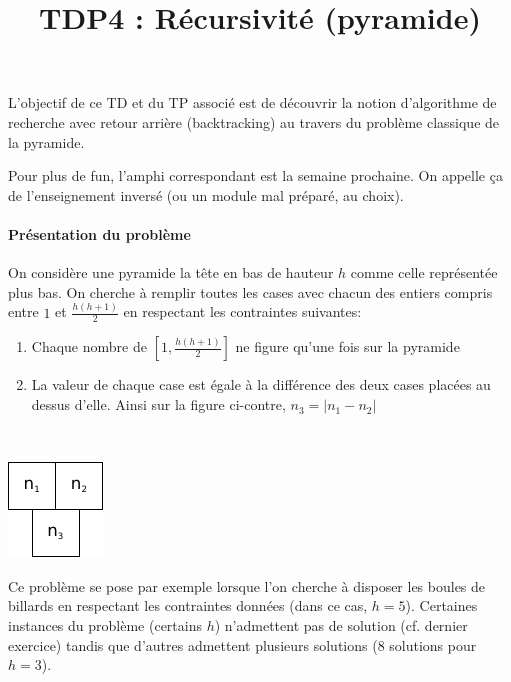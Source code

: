 \documentclass[10pt]{article}\usepackage[nu]{esial}
\begin{document}
\color{black}
\title{TDP4 : Récursivité (pyramide)}
\maketitle

L'objectif de ce TD et du TP associé est de découvrir la notion d'algorithme de
recherche avec retour arrière (backtracking) au travers du problème classique de
la pyramide.

\begin{Reponse}
  Pour plus de fun, l'amphi correspondant est la semaine prochaine. On appelle
  ça de l'enseignement inversé (ou un module mal préparé, au choix).
\end{Reponse}


\paragraph{Présentation du problème}

On considère une pyramide la tête en bas de hauteur $h$ comme celle
représentée plus bas. On cherche à remplir toutes les cases avec chacun des
entiers compris entre $1$ et $\frac{h(h+1)}{2}$ en respectant les contraintes
suivantes:

\begin{minipage}{.8\linewidth}
\begin{enumerate}
\item Chaque nombre de $\left[1,\frac{h(h+1)}{2}\right]$ ne figure qu'une fois sur la pyramide
\item La valeur de chaque case est égale à la différence des deux cases placées
  au dessus d'elle.
  Ainsi sur la figure ci-contre, $n_3=|n_1 - n_2|$
\end{enumerate}  
\end{minipage}~\begin{minipage}{.2\linewidth}
  \centering
  \includegraphics{img/pyramide3.pdf} 
\end{minipage}


\noindent Ce problème se pose par exemple lorsque l'on cherche à disposer les
boules de billards en respectant les contraintes données (dans ce cas,
$h=5$). Certaines instances du problème (certains $h$) n'admettent pas de
solution (cf. dernier exercice) tandis que d'autres admettent plusieurs
solutions (8 solutions pour $h=3$).
\end{document}
